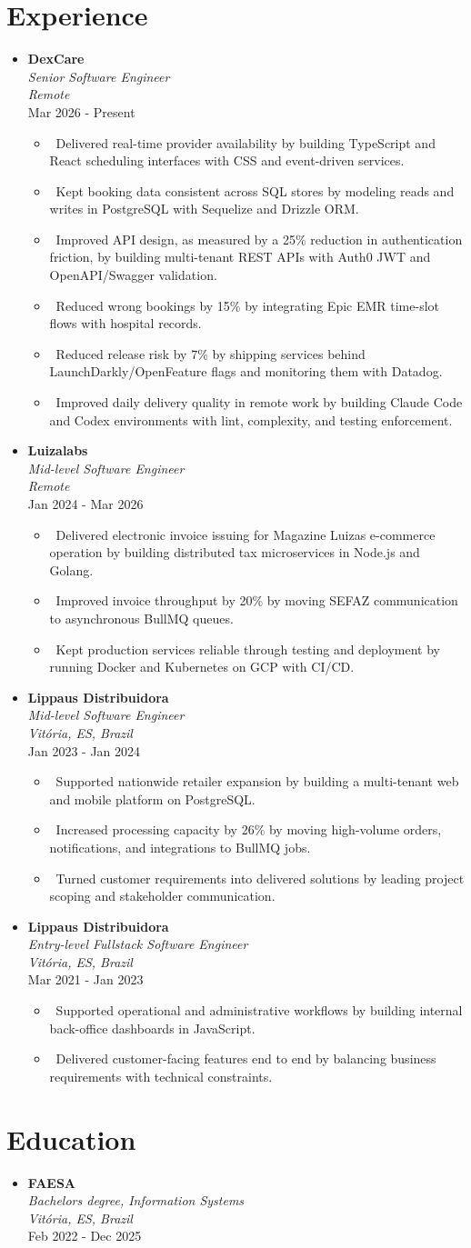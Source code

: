 \documentclass[letterpaper,10pt]{article}
\newcommand{\resumeItem}[1]{\item\small{#1}}
\newcommand{\resumeSubheading}[4]{
\item
  \textbf{#1}\\[1pt]
  \textit{#3}\\[1pt]
  \textit{#4}\\[1pt]
  #2\vspace{4pt}
}
\newcommand{\resumeSubHeadingList}{\begin{itemize}[leftmargin=0.15in, label={}, nosep]}
\newcommand{\resumeSubHeadingListEnd}{\end{itemize}}
\newcommand{\resumeRoleGap}{\vspace{4pt}}
\begin{document}
\section{Experience}
\resumeSubHeadingList
  \resumeSubheading
      {DexCare}{Mar 2026 - Present}
      {Senior Software Engineer}{Remote}
      \resumeSubHeadingList
          \resumeItem{\textbullet\ Delivered real-time provider availability by building TypeScript and React scheduling interfaces with CSS and event-driven services.}
          \resumeItem{\textbullet\ Kept booking data consistent across SQL stores by modeling reads and writes in PostgreSQL with Sequelize and Drizzle ORM.}
          \resumeItem{\textbullet\ Improved API design, as measured by a 25\% reduction in authentication friction, by building multi-tenant REST APIs with Auth0 JWT and OpenAPI/Swagger validation.}
          \resumeItem{\textbullet\ Reduced wrong bookings by 15\% by integrating Epic EMR time-slot flows with hospital records.}
          \resumeItem{\textbullet\ Reduced release risk by 7\% by shipping services behind LaunchDarkly/OpenFeature flags and monitoring them with Datadog.}
          \resumeItem{\textbullet\ Improved daily delivery quality in remote work by building Claude Code and Codex environments with lint, complexity, and testing enforcement.}
      \resumeSubHeadingListEnd
  \resumeRoleGap
  \resumeSubheading
      {Luizalabs}{Jan 2024 - Mar 2026}
      {Mid-level Software Engineer}{Remote}
      \resumeSubHeadingList
          \resumeItem{\textbullet\ Delivered electronic invoice issuing for Magazine Luiza\textquotesingle{}s e-commerce operation by building distributed tax microservices in Node.js and Golang.}
          \resumeItem{\textbullet\ Improved invoice throughput by 20\% by moving SEFAZ communication to asynchronous BullMQ queues.}
          \resumeItem{\textbullet\ Kept production services reliable through testing and deployment by running Docker and Kubernetes on GCP with CI/CD.}
      \resumeSubHeadingListEnd
  \resumeRoleGap
  \resumeSubheading
      {Lippaus Distribuidora}{Jan 2023 - Jan 2024}
      {Mid-level Software Engineer}{Vit\'oria, ES, Brazil}
      \resumeSubHeadingList
          \resumeItem{\textbullet\ Supported nationwide retailer expansion by building a multi-tenant web and mobile platform on PostgreSQL.}
          \resumeItem{\textbullet\ Increased processing capacity by 26\% by moving high-volume orders, notifications, and integrations to BullMQ jobs.}
          \resumeItem{\textbullet\ Turned customer requirements into delivered solutions by leading project scoping and stakeholder communication.}
      \resumeSubHeadingListEnd
  \resumeRoleGap
  \resumeSubheading
      {Lippaus Distribuidora}{Mar 2021 - Jan 2023}
      {Entry-level Fullstack Software Engineer}{Vit\'oria, ES, Brazil}
      \resumeSubHeadingList
          \resumeItem{\textbullet\ Supported operational and administrative workflows by building internal back-office dashboards in JavaScript.}
          \resumeItem{\textbullet\ Delivered customer-facing features end to end by balancing business requirements with technical constraints.}
      \resumeSubHeadingListEnd
\resumeSubHeadingListEnd

\resumeRoleGap
\section{Education}
\resumeSubHeadingList
  \resumeSubheading
      {FAESA}{Feb 2022 - Dec 2025}
      {Bachelor\textquotesingle{}s degree, Information Systems}{Vit\'oria, ES, Brazil}
\resumeSubHeadingListEnd
\end{document}

